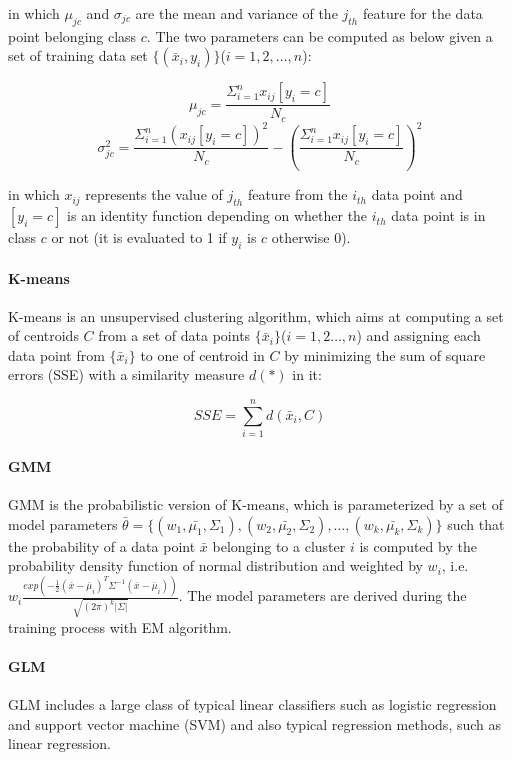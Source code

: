in which $\mu_{jc}$ and $\sigma_{jc}$ are the mean and variance of the $j_{th}$ feature for the data point belonging class $c$. The two parameters can be computed as below given a set of training data set $\{(\bar{x}_i, y_i)\}$($i=1,2,\dots, n$):

\begin{equation}\label{eq: nb_mean}
    \mu_{jc} = \frac{\Sigma_{i=1}^nx_{ij}[y_i=c]}{N_c}
\end{equation}
\begin{equation}\label{eq: nb_var}
    \sigma_{jc}^2 = \frac{\Sigma_{i=1}^n(x_{ij}[y_i=c])^2}{N_c}-(\frac{\Sigma_{i=1}^nx_{ij}[y_i=c]}{N_c})^2
\end{equation}

in which $x_{ij}$ represents the value of $j_{th}$ feature from the $i_{th}$ data point and $[y_i=c]$ is an identity function depending on whether the $i_{th}$ data point is in class $c$ or not (it is evaluated to 1 if $y_i$ is $c$ otherwise 0).

\paragraph{K-means} K-means is an unsupervised clustering algorithm, which aims at computing a set of centroids $C$ from a set of data points $\{\bar{x}_i\}$($i=1,2\dots,n$) and assigning each data point from $\{\bar{x}_i\}$ to one of centroid in $C$ by minimizing the sum of square errors (SSE) with a similarity measure $d(*)$ in it:

\begin{equation}\label{eq: sse_k_means}
    SSE = \sum_{i=1}^nd(\bar{x}_i, C)
\end{equation}

\paragraph{GMM} GMM is the probabilistic version of K-means, which is parameterized by a set of model parameters $\bar{\theta} = \{(w_1, \bar{\mu_1}, \Sigma_1), (w_2, \bar{\mu_2}, \Sigma_2), \dots, (w_k, \bar{\mu_k}, \Sigma_k)\}$ such that the probability of a data point $\bar{x}$ belonging to a cluster $i$ is computed by the probability density function of normal distribution and weighted by $w_i$, i.e.  $w_i\frac{exp(-\frac{1}{2}(\bar{x}-\bar{\mu}_i)^T\Sigma^{-1}(\bar{x}-\bar{\mu}_i))}{\sqrt{(2\pi)^k|\Sigma|}}$. The model parameters are derived during the training process with EM algorithm.

\paragraph{GLM} GLM includes a large class of typical linear classifiers such as logistic regression and support vector machine (SVM) and also typical regression methods, such as linear regression.